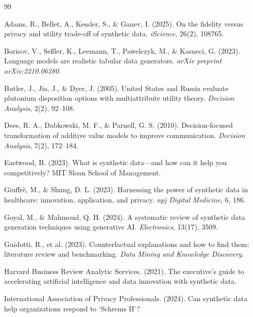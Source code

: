 \documentclass[12pt,a4paper]{article}
\begin{document}
\begin{thebibliography}{99}

Adams, R., Bellet, A., Kessler, S., \& Ganev, I. (2025).
On the fidelity versus privacy and utility trade-off of synthetic data.
\textit{iScience}, 26(2), 108765.

Borisov, V., Se{\ss}ler, K., Leemann, T., Pawelczyk, M., \& Kasneci, G. (2023).
Language models are realistic tabular data generators.
\textit{arXiv preprint arXiv:2210.06280}.

Butler, J., Jia, J., \& Dyer, J. (2005).
United States and Russia evaluate plutonium disposition options with multiattribute utility theory.
\textit{Decision Analysis}, 2(2), 92--108.

Dees, R. A., Dabkowski, M. F., \& Parnell, G. S. (2010).
Decision-focused transformation of additive value models to improve communication.
\textit{Decision Analysis}, 7(2), 172--184.

Eastwood, B. (2023).
What is synthetic data---and how can it help you competitively?
MIT Sloan School of Management.

Giuffr{\`e}, M., \& Shung, D. L. (2023).
Harnessing the power of synthetic data in healthcare: innovation, application, and privacy.
\textit{npj Digital Medicine}, 6, 186.

Goyal, M., \& Mahmoud, Q. H. (2024).
A systematic review of synthetic data generation techniques using generative AI.
\textit{Electronics}, 13(17), 3509.

Guidotti, R., et al. (2023).
Counterfactual explanations and how to find them: literature review and benchmarking.
\textit{Data Mining and Knowledge Discovery}.

Harvard Business Review Analytic Services. (2021).
The executive's guide to accelerating artificial intelligence and data innovation with synthetic data.

International Association of Privacy Professionals. (2024).
Can synthetic data help organizations respond to `Schrems II'?


\end{thebibliography}
\end{document}
